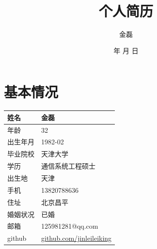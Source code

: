 \documentclass[titlepage]{article}
\begin{document}

\pagestyle{fancy}
\lhead{}
\lfoot{}
\cfoot{}
\rfoot{}
\renewcommand{\headrulewidth}{0.4pt}
\renewcommand{\footrulewidth}{0.4pt}

\title{个人简历} 
\author{金磊} 
\renewcommand{\today}{\number\year 年 \number\month 月 \number\day 日}
\date{\today} 
\maketitle

\setlength{\parindent}{2em} 
\addtolength{\parskip}{3pt}

\renewcommand{\contentsname}{目录}
\setcounter{tocdepth}{2}
\tableofcontents 

\newpage
\section{基本情况}

\begin{tabular}{|l|l|}
\hline
姓名 & 金磊 \\
\hline
年龄 & 32 \\
\hline
出生年月 & 1982-02 \\
\hline
毕业院校 & 天津大学 \\
\hline
学历 & 通信系统工程硕士 \\
\hline 
出生地 & 天津 \\
\hline 
手机 & 13820788636 \\
\hline 
住址 & 北京昌平 \\
\hline 
婚姻状况 & 已婚 \\
\hline 
邮箱 & 125981281@qq.com \\
\hline 
github & \href{http:/www.github.com/jinleileiking?tab=repositories}{github.com/jinleileiking} \\
\hline
\end{tabular}
\end{document}
